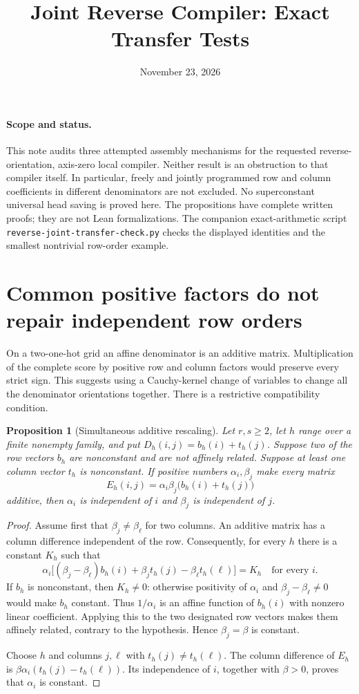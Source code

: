 \documentclass[11pt]{article}
\title{Joint Reverse Compiler: Exact Transfer Tests}
\author{}
\date{November 23, 2026}
\newtheorem{proposition}{Proposition}
\begin{document}
\maketitle

\paragraph{Scope and status.}
This note audits three attempted assembly mechanisms for the requested
reverse-orientation, axis-zero local compiler. Neither result is an
obstruction to that compiler itself. In particular, freely and jointly
programmed row and column coefficients in different denominators are
not excluded. No superconstant universal head saving is proved here.
The propositions have complete written proofs; they are not Lean
formalizations. The companion exact-arithmetic script
\texttt{reverse-joint-transfer-check.py} checks the displayed identities
and the smallest nontrivial row-order example.

\section{Common positive factors do not repair independent row orders}

On a two-one-hot grid an affine denominator is an additive matrix.
Multiplication of the complete score by positive row and column factors
would preserve every strict sign. This suggests using a Cauchy-kernel
change of variables to change all the denominator orientations together.
There is a restrictive compatibility condition.

\begin{proposition}[Simultaneous additive rescaling]
Let $r,s\geq 2$, let $h$ range over a finite nonempty family, and put
$D_h(i,j)=b_h(i)+t_h(j)$. Suppose two of the row vectors $b_h$ are
nonconstant and are not affinely related. Suppose at least one column
vector $t_h$ is nonconstant. If positive numbers $\alpha_i,\beta_j$
make every matrix
\[
 E_h(i,j)=\alpha_i\beta_j\bigl(b_h(i)+t_h(j)\bigr)
\]
additive, then $\alpha_i$ is independent of $i$ and $\beta_j$ is
independent of $j$.
\end{proposition}
\begin{proof}
Assume first that $\beta_j\neq\beta_\ell$ for two columns. An additive
matrix has a column difference independent of the row. Consequently,
for every $h$ there is a constant $K_h$ such that
\[
 \alpha_i\bigl[(\beta_j-\beta_\ell)b_h(i)
      +\beta_jt_h(j)-\beta_\ell t_h(\ell)\bigr]=K_h
 \quad\text{for every }i.
\]
If $b_h$ is nonconstant, then $K_h\neq0$: otherwise positivity of
$\alpha_i$ and $\beta_j-\beta_\ell\neq0$ would make $b_h$ constant.
Thus $1/\alpha_i$ is an affine function of $b_h(i)$ with nonzero
linear coefficient. Applying this to the two designated row vectors
makes them affinely related, contrary to the hypothesis.
Hence $\beta_j=\beta$ is constant.

Choose $h$ and columns $j,\ell$ with $t_h(j)\neq t_h(\ell)$.
The column difference of $E_h$ is
$\beta\alpha_i(t_h(j)-t_h(\ell))$. Its independence of $i$, together
with $\beta>0$, proves that $\alpha_i$ is constant.
\end{proof}
\end{document}
